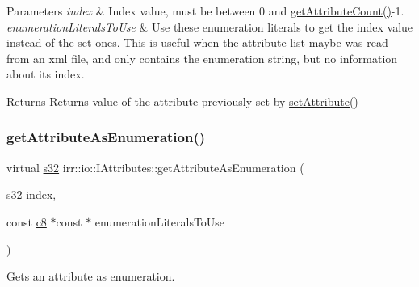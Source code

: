 \begin{DoxyParams}{Parameters}
{\em index} & Index value, must be between 0 and \hyperlink{classirr_1_1io_1_1IAttributes_a796bdd9440ee7ba0b6742a90a82870b6}{get\+Attribute\+Count()}-\/1. \\
\hline
{\em enumeration\+Literals\+To\+Use} & Use these enumeration literals to get the index value instead of the set ones. This is useful when the attribute list maybe was read from an xml file, and only contains the enumeration string, but no information about its index. \\
\hline
\end{DoxyParams}
\begin{DoxyReturn}{Returns}
Returns value of the attribute previously set by \hyperlink{classirr_1_1io_1_1IAttributes_a03fa31acb481ae23678676cc183f09a6}{set\+Attribute()} 
\end{DoxyReturn}
\mbox{\label{classirr_1_1io_1_1IAttributes_a906b34ac742d3418d16afcf1d1e2aaa4}} 
\subsubsection{\texorpdfstring{get\+Attribute\+As\+Enumeration()}{getAttributeAsEnumeration()}\hspace{0.1cm}{\footnotesize\ttfamily [6/8]}}
{\footnotesize\ttfamily virtual \hyperlink{namespaceirr_ac66849b7a6ed16e30ebede579f9b47c6}{s32} irr\+::io\+::\+I\+Attributes\+::get\+Attribute\+As\+Enumeration (\begin{DoxyParamCaption}\item[{\hyperlink{namespaceirr_ac66849b7a6ed16e30ebede579f9b47c6}{s32}}]{index,  }\item[{const \hyperlink{namespaceirr_a9395eaea339bcb546b319e9c96bf7410}{c8} $\ast$const $\ast$}]{enumeration\+Literals\+To\+Use }\end{DoxyParamCaption})\hspace{0.3cm}{\ttfamily [pure virtual]}}



Gets an attribute as enumeration. 


